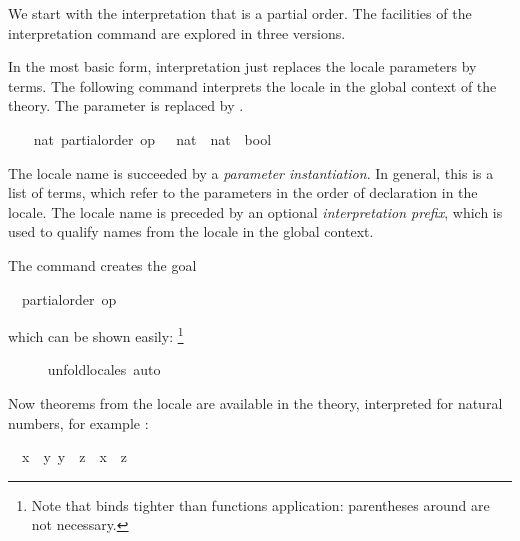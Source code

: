 \begin{isabellebody}
\begin{isamarkuptext}
  We start with the
  interpretation that \isa{{\isasymle}} is a partial order.  The facilities of
  the interpretation command are explored in three versions.%
\end{isamarkuptext}%
\isamarkuptrue%
%
\isamarkuptrue%
%
\begin{isamarkuptext}%
In the most basic form, interpretation just replaces the locale
  parameters by terms.  The following command interprets the locale
   in the global context of the theory.  The
  parameter  is replaced by .%
\end{isamarkuptext}%
\isamarkuptrue%
%
\isadelimvisible
\ \ %
\endisadelimvisible
%
\isatagvisible
{}\isamarkupfalse%
\ nat{\isacharcolon}\ partial{\isacharunderscore}order\ {\isachardoublequoteopen}op\ {\isasymle}\ {\isacharcolon}{\isacharcolon}\ nat\ {\isasymRightarrow}\ nat\ {\isasymRightarrow}\ bool{\isachardoublequoteclose}%
\begin{isamarkuptxt}%
The locale name is succeeded by a \emph{parameter
  instantiation}.  In general, this is a list of terms, which refer to
  the parameters in the order of declaration in the locale.  The
  locale name is preceded by an optional \emph{interpretation prefix},
  which is used to qualify names from the locale in the global
  context.

  The command creates the goal \begin{isabelle}%
\ {}{\isachardot}\ partial{\isacharunderscore}order\ op\ {\isasymle}%
\end{isabelle} which can be shown
  easily:%
\footnote{Note that  binds tighter than functions
  application: parentheses around  are not necessary.}%
\end{isamarkuptxt}%
\isamarkuptrue%
\ \ \ \ \isamarkupfalse%
\ unfold{\isacharunderscore}locales\ auto%
\endisatagvisible
{\isafoldvisible}%
%
\isadelimvisible
%
\endisadelimvisible
%
\begin{isamarkuptext}%
Now theorems from the locale are available in the theory,
  interpreted for natural numbers, for example : \begin{isabelle}%
\ \ {\isasymlbrakk}{\isacharquery}x\ {\isasymle}\ {\isacharquery}y{\isacharsemicolon}\ {\isacharquery}y\ {\isasymle}\ {\isacharquery}z{\isasymrbrakk}\ {\isasymLongrightarrow}\ {\isacharquery}x\ {\isasymle}\ {\isacharquery}z%
\end{isabelle}


\end{isamarkuptext}
\end{isabellebody}
